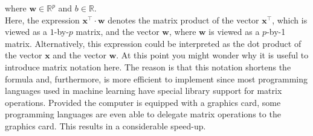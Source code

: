 \quad where  $\mathbf{w} \in \mathbb{R}^p$ and $b\in\mathbb{R}$.
\\[0.2cm]
Here, the expression $\mathbf{x}^\top \cdot \mathbf{w}$ denotes the matrix product of the vector
$\mathbf{x}^\top$, which is viewed as a $1$-by-$p$ matrix, and the vector $\mathbf{w}$, where $\mathbf{w}$ is
viewed as a $p$-by-1 matrix.  Alternatively, this
expression could be interpreted as the dot product of the vector $\mathbf{x}$ and the vector $\mathbf{w}$.
At this point you might wonder why it is useful to introduce matrix notation here.  The reason is
that this notation shortens the formula and, furthermore, is more efficient to implement since most
programming languages used in machine learning have special library support for matrix operations.  
Provided the computer is equipped with a graphics card,  some
programming languages are even able to delegate matrix operations to the graphics card.  This results in a
considerable speed-up.

